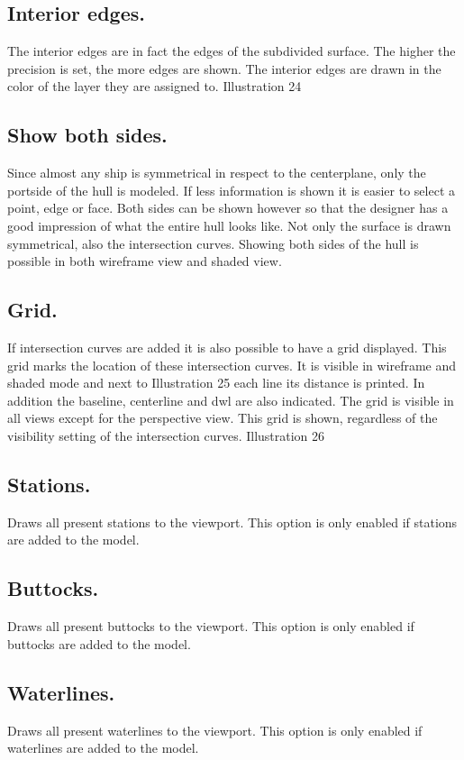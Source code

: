 \documentclass[12pt]{article}
\begin{document}
\subsection{Interior edges.}
The interior edges are in fact the edges of the
subdivided surface. The higher the precision is
set, the more edges are shown. The interior
edges are drawn in the color of the layer they
are assigned to.
Illustration 24

\subsection{Show both sides.}
Since almost any ship is symmetrical in respect to the centerplane, only the portside of the hull is
modeled. If less information is shown it is easier to select a point,
edge or face. Both sides can be shown however so that the
designer has a good impression of what the entire hull looks like.
Not only the surface is drawn symmetrical, also the intersection
curves. Showing both sides of the hull is possible in both
wireframe view and shaded view.

\subsection{Grid.}
If intersection curves are added it is also possible to have a grid
displayed. This grid marks the location of these intersection
curves. It is visible in wireframe and shaded mode and next to
Illustration 25
each line its distance is printed. In addition the baseline, centerline
and dwl are also indicated. The grid is visible in all views except for the perspective view. This grid
is shown, regardless of the visibility setting of the intersection curves.
Illustration 26

\subsection{Stations.}
Draws all present stations to the viewport. This option is only enabled if stations are added to the
model.

\subsection{Buttocks.}
Draws all present buttocks to the viewport. This option is only enabled if buttocks are added to the
model.

\subsection{Waterlines.}
Draws all present waterlines to the viewport. This option is only enabled if waterlines are added to
the model.
\end{document}
